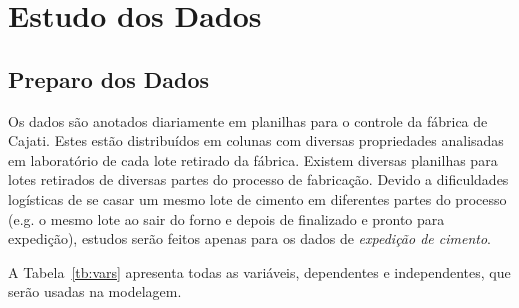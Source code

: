 \chapter{Estudo dos Dados}
\label{cap:estudodados}


\section{Preparo dos Dados}


Os dados são anotados diariamente em planilhas para o controle da fábrica
de Cajati. Estes estão distribuídos em colunas com diversas propriedades analisadas em
laboratório de cada lote retirado da fábrica. Existem diversas planilhas para
lotes retirados de diversas partes do processo de fabricação. Devido a dificuldades logísticas de se casar um
mesmo lote de cimento em diferentes partes do processo (e.g. o mesmo lote ao
sair do forno e depois de finalizado e pronto para expedição), estudos serão feitos apenas para os dados de
\textit{expedição de cimento}. 

A Tabela~\ref{tb:vars} apresenta todas as variáveis, dependentes e independentes,
que serão usadas na modelagem.


